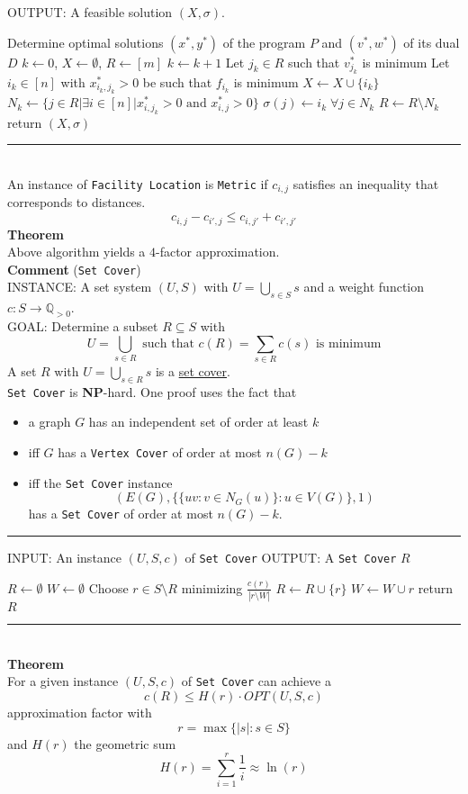 \documentclass[a4paper, 12pt]{article}
\begin{document}
	OUTPUT: A feasible solution $(X, \sigma)$.
	\begin{algorithmic}[1]
		\State Determine optimal solutions $(x^*, y^*)$ of the program $P$ and $(v^*, w^*)$ of its dual $D$
		\State $k \gets 0$, $X \gets \emptyset$, $R \gets [m]$
		\State $k \gets k+1$
		\State Let $j_k \in R$ such that $v_{j_k}^*$ is minimum
		\State Let $i_k \in [n]$ with $x_{i_k,j_k}^* > 0$ be such that $f_{i_k}$ is minimum
		\State $X \gets X \cup \{i_k\}$
		\State $N_k \gets \{j \in R | \exists i \in [n] | x_{i,j_k}^* > 0 \text{ and } x_{i,j}^* > 0\}$
		\State $\sigma(j) \gets i_k \; \forall j \in N_k$
		\State $R \gets R \setminus N_k$
		\EndWhile
		\State return $(X, \sigma)$
	\end{algorithmic}
	\par\noindent\rule{\textwidth}{0.4pt}\\
	An instance of \texttt{Facility Location} is \texttt{Metric} if $c_{i,j}$ satisfies an inequality that corresponds to distances. \[c_{i,j} - c_{i',j} \leq c_{i,j'} + c_{i',j'}\]
	\textbf{Theorem}\\
	Above algorithm yields a $4$-factor approximation.\\
	\textbf{Comment} (\texttt{Set Cover})\\
	INSTANCE: A set system $(U,S)$ with $U = \bigcup_{s \in S} s$ and a weight function $c:S \to \mathbb{Q}_{>0}$.\\
	GOAL: Determine a subset $R \subseteq S$ with \[U = \bigcup_{s \in R} \text{ such that } c(R) = \sum_{s\in R} c(s) \text{ is minimum}\]
	A set $R$ with $U = \bigcup_{s \in R} s$ is a \underline{set cover}.\\
	
	\texttt{Set Cover} is \textbf{NP}-hard. One proof uses the fact that \begin{itemize}
		\item a graph $G$ has an independent set of order at least $k$
		\item iff $G$ has a \texttt{Vertex Cover} of order at most $n(G)-k$
		\item iff the \texttt{Set Cover} instance \[\left(E(G), \{\{uv: v \in N_G(u)\}: u \in V(G)\}, 1\right)\]
		has a \texttt{Set Cover} of order at most $n(G)-k$.
	\end{itemize} 
	\par\noindent\rule{\textwidth}{0.4pt}
	INPUT: An instance $(U,S,c)$ of \texttt{Set Cover}
	OUTPUT: A \texttt{Set Cover} $R$
	\begin{algorithmic}[1]
		\State $R \gets \emptyset$
		\State $W \gets \emptyset$
		\State Choose $r \in S\setminus R$ minimizing $\frac{c(r)}{\left|r\setminus W\right|}$
		\State $R \gets R \cup \{r\}$
		\State $W \gets W \cup r$
		\EndWhile
		\State return $R$
	\end{algorithmic}
	\par\noindent\rule{\textwidth}{0.4pt}\\
	\textbf{Theorem}\\
	For a given instance $(U,S,c)$ of \texttt{Set Cover} can achieve a \[c(R) \leq H(r)\cdot OPT(U,S,c)\] approximation factor with \[r = \max\{\left|s\right|: s \in S\}\] and $H(r)$ the geometric sum \[H(r) = \sum_{i = 1}^{r} \frac{1}{i} \approx \ln(r)\]
\end{document}
